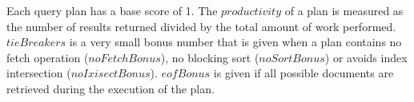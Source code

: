 Each query plan has a base score of 1. The $productivity$ of a plan is measured as the number of results returned divided by the total amount of work performed. $tieBreakers$ is a very small bonus number that is given when a plan contains no fetch operation ($noFetchBonus$), no blocking sort ($noSortBonus$) or avoids index intersection ($noIxisectBonus$). $eofBonus$ is given if all possible documents are retrieved during the execution of the plan.